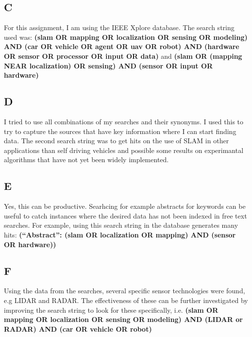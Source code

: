 \documentclass[a4paper, 12pt]{article}
\begin{document}
\subsection*{C}
For this assignment, I am using the IEEE Xplore database. The search string used was:
\textbf{(slam OR mapping OR localization OR sensing OR modeling) AND (car OR vehicle OR agent OR uav OR robot) AND (hardware OR sensor OR processor OR input OR data)} 
\linebreak
and
\linebreak
\textbf{(slam OR (mapping NEAR localization) OR sensing) AND (sensor OR input OR hardware)}
\subsection*{D}
I tried to use all combinations of my searches and their synonyms. I used this
to try to capture the sources that have key information where I can start finding
data. The second search string was to get hits on the use of SLAM in other
applications than self driving vehicles and possible some results on 
experimantal algorithms that have not yet been widely implemented.
\subsection*{E}
Yes, this can be productive. Searhcing for example abstracts for keywords can be
useful to catch instances where the desired data has not been indexed in free text
searches. For example, using this search string in the database generates many hits:
\linebreak
\textbf{(``Abstract'': (slam OR localization OR mapping) AND (sensor OR hardware))}
\subsection*{F}
Using the data from the searches, several specific sensor technologies were found, e.g LIDAR and RADAR. 
The effectiveness of these can be further investigated by improving the search 
string to look for these specifically, i.e. \linebreak
\textbf{(slam OR mapping OR localization OR sensing OR modeling) AND (LIDAR or RADAR) AND (car OR vehicle OR robot)}
\end{document}
